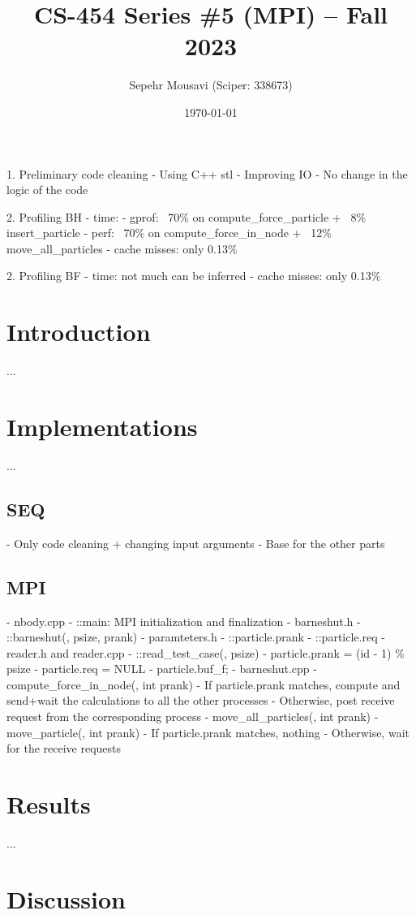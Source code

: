 \documentclass[10pt,journal,compsocconf]{IEEEtran}
\title{CS-454 Series \#5 (MPI) -- Fall 2023}
\author{
  Sepehr Mousavi (Sciper: 338673)
}
\date{\today}
\begin{document}
\maketitle


1. Preliminary code cleaning
  - Using C++ stl
  - Improving IO
  - No change in the logic of the code

2. Profiling BH
  - time:
    - gprof: ~70\% on compute_force_particle + ~8\% insert_particle
    - perf: ~70\% on compute_force_in_node + ~12\% move_all_particles
  - cache misses: only 0.13\%
    
2. Profiling BF
  - time: not much can be inferred
  - cache misses: only 0.13\%


\section{Introduction}
...

\section{Implementations}
...

\subsection{SEQ}
- Only code cleaning + changing input arguments
- Base for the other parts

\subsection{MPI}
- nbody.cpp
  - ::main: MPI initialization and finalization
- barneshut.h
  - ::barneshut(, psize, prank)
- paramteters.h
  - ::particle.prank
  - ::particle.req
- reader.h and reader.cpp
  - ::read_test_case(, psize)
  - particle.prank = (id - 1) \% psize
  - particle.req = NULL
  - particle.buf_f;
- barneshut.cpp
  - compute_force_in_node(, int prank)
    - If particle.prank matches, compute and send+wait the calculations to all the other processes
    - Otherwise, post receive request from the corresponding process
  - move_all_particles(, int prank)
  - move_particle(, int prank)
      - If particle.prank matches, nothing
      - Otherwise, wait for the receive requests

\section{Results}
...

\section{Discussion}
\end{document}
